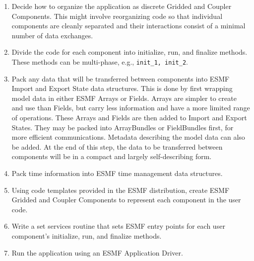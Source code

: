 \begin{enumerate}

\item Decide how to organize the application as discrete Gridded 
and Coupler Components.  This might involve reorganizing code
so that individual components are cleanly separated and their 
interactions consist of a minimal number of data exchanges.

\item Divide the code for each component into initialize, run, and
finalize methods.  These methods can be multi-phase, e.g., 
{\tt init\_1, init\_2}.

\item Pack any data that will be transferred between components
into ESMF Import and Export State data structures.  This is done
by first wrapping model data in either ESMF Arrays or Fields.
Arrays are simpler to create and use than Fields, but carry less
information and have a more limited range of operations.
These Arrays and Fields are then added to Import and
Export States.  They may be packed into ArrayBundles or
FieldBundles first, for more efficient communications.
Metadata describing the model data can also be added.
At the end of this step, the data to be transferred between
components will be in a compact and largely self-describing
form.

\item Pack time information into ESMF time management data 
structures.

\item Using code templates provided in the ESMF distribution, create
ESMF Gridded and Coupler Components to represent each component
in the user code.

\item Write a set services routine that sets ESMF entry 
points for each user component's initialize, run, and finalize 
methods.

\item Run the application using an ESMF Application Driver.

\end{enumerate} 











